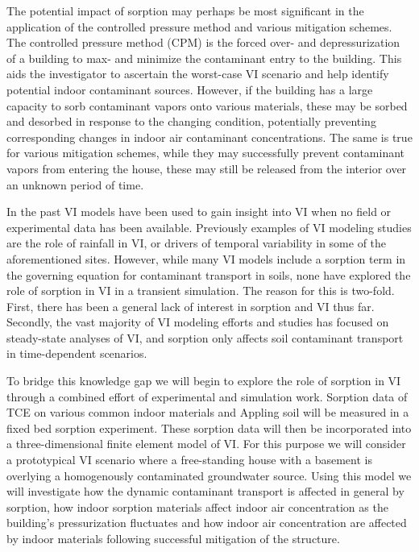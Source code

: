 The potential impact of sorption may perhaps be most significant in the application of the controlled pressure method and various mitigation schemes.
The controlled pressure method (CPM) is the forced over- and depressurization of a building to max- and minimize the contaminant entry to the building.
This aids the investigator to ascertain the worst-case VI scenario and help identify potential indoor contaminant sources\cite{mchugh_recent_2017,holton_long-term_2015}.
However, if the building has a large capacity to sorb contaminant vapors onto various materials, these may be sorbed and desorbed in response to the changing condition, potentially preventing corresponding changes in indoor air contaminant concentrations.
The same is true for various mitigation schemes, while they may successfully prevent contaminant vapors from entering the house, these may still be released from the interior over an unknown period of time\cite{meininghaus_diffusion_2000,meininghaus_diffusion_2002}.\par

In the past VI models have been used to gain insight into VI when no field or experimental data has been available.
Previously examples of VI modeling studies are the role of rainfall in VI\cite{shen_numerical_2012}, or drivers of temporal variability in some of the aforementioned sites\cite{strom_factors_2019}.
However, while many VI models include a sorption term in the governing equation for contaminant transport in soils, none have explored the role of sorption in VI in a transient simulation.
The reason for this is two-fold.
First, there has been a general lack of interest in sorption and VI thus far.
Secondly, the vast majority of VI modeling efforts and studies has focused on steady-state analyses of VI, and sorption only affects soil contaminant transport in time-dependent scenarios.\par

To bridge this knowledge gap we will begin to explore the role of sorption in VI through a combined effort of experimental and simulation work.
Sorption data of TCE on various common indoor materials and Appling soil will be measured in a fixed bed sorption experiment.
These sorption data will then be incorporated into a three-dimensional finite element model of VI.
For this purpose we will consider a prototypical VI scenario where a free-standing house with a basement is overlying a homogenously contaminated groundwater source.
Using this model we will investigate how the dynamic contaminant transport is affected in general by sorption, how indoor sorption materials affect indoor air concentration as the building's pressurization fluctuates and how indoor air concentration are affected by indoor materials following successful mitigation of the structure.
